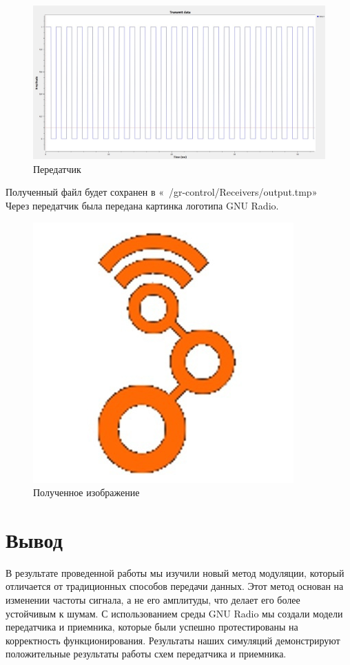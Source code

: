 \documentclass{article}
\begin{document}
\begin{figure}[ht]
    \centering
    \includegraphics[width=0.8\linewidth]{7.png}
    \caption{Передатчик}
    \label{fig:enter-label7}
\end{figure}
\newpage





\newpage
Полученный файл будет сохранен в «~/gr-control/Receivers/output.tmp» \\
Через передатчик была передана картинка логотипа GNU Radio.

\begin{figure}[ht]
    \centering
    \includegraphics[width=0.7\linewidth]{8.png}
    \caption{Полученное изображение}
    \label{fig:enter-label8}
\end{figure}
\newpage





\newpage
\section{Вывод}
В результате проведенной работы мы изучили новый метод модуляции, который отличается от традиционных способов передачи данных. Этот метод основан на изменении частоты сигнала, а не его амплитуды, что делает его более устойчивым к шумам. С использованием среды GNU Radio мы создали модели передатчика и приемника, которые были успешно протестированы на корректность функционирования. Результаты наших симуляций демонстрируют положительные результаты работы схем передатчика и приемника.
\newpage
\end{document}
